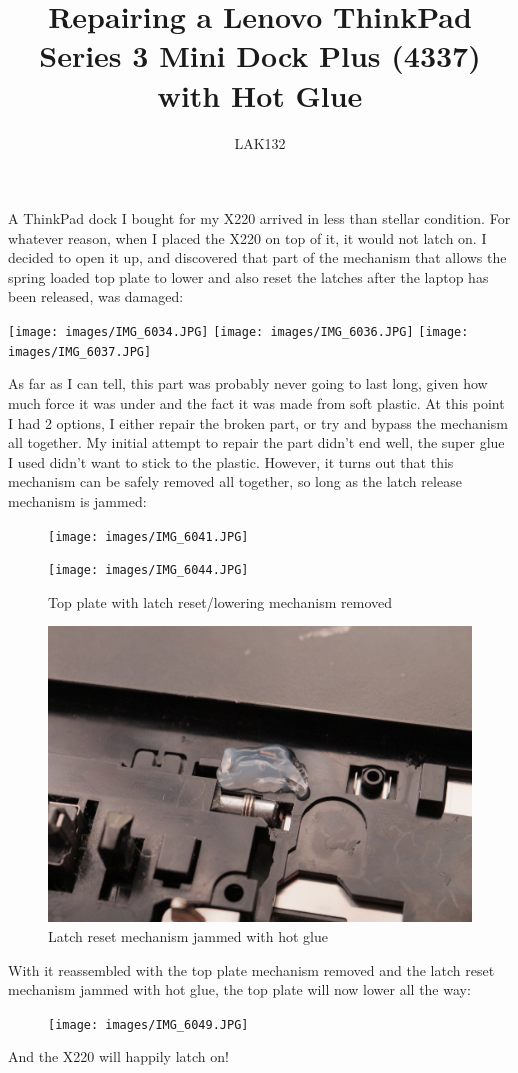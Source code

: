 \documentclass{article}
\title{Repairing a Lenovo ThinkPad Series 3 Mini Dock Plus (4337) with Hot Glue}
\author{LAK132}
\begin{document}
\maketitle

A ThinkPad dock I bought for my X220 arrived in less than stellar condition.
For whatever reason, when I placed the X220 on top of it,
it would not latch on.
I decided to open it up, and discovered that part of the mechanism that allows
the spring loaded top plate to lower and also reset the latches after the
laptop has been released, was damaged:

\texttt{[image: images/IMG\_6034.JPG]}
\texttt{[image: images/IMG\_6036.JPG]}
\texttt{[image: images/IMG\_6037.JPG]}

As far as I can tell, this part was probably never going to last long,
given how much force it was under and the fact it was made from soft plastic.
At this point I had 2 options, I either repair the broken part,
or try and bypass the mechanism all together.
My initial attempt to repair the part didn't end well,
the super glue I used didn't want to stick to the plastic.
However, it turns out that this mechanism can be safely removed all together,
so long as the latch release mechanism is jammed:

\begin{figure}
	\caption{}
	\texttt{[image: images/IMG\_6041.JPG]}
\end{figure}

\begin{figure}
	\caption{Top plate with latch reset/lowering mechanism removed}
	\texttt{[image: images/IMG\_6044.JPG]}
\end{figure}

\begin{figure}
	\caption{Latch reset mechanism jammed with hot glue}
	\includegraphics[width=55em]{images/IMG_6047.JPG}
\end{figure}

With it reassembled with the top plate mechanism removed and the latch reset
mechanism jammed with hot glue, the top plate will now lower all the way:

\begin{figure}
	\caption{}
	\texttt{[image: images/IMG\_6049.JPG]}
\end{figure}

And the X220 will happily latch on!
\end{document}
